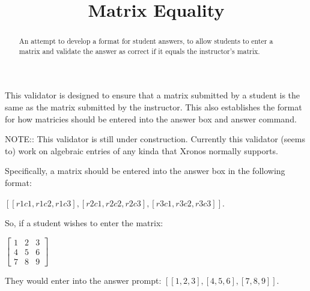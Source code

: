 \documentclass{ximera}
\title{Matrix Equality}
\begin{document}
\begin{abstract}
    An attempt to develop a format for student answers, to allow students to enter a matrix and validate the answer as correct if it equals the instructor's matrix.
\end{abstract}
\maketitle

This validator is designed to ensure that a matrix submitted by a student is the same as the matrix submitted by the instructor. This also establishes the format for how matricies should be entered into the answer box and answer command.

NOTE:: This validator is still under construction. Currently this validator (seems to) work on algebraic entries of any kinda that Xronos normally supports.

Specifically, a matrix should be entered into the answer box in the following format:

$[ [r1c1,r1c2,r1c3],[r2c1,r2c2,r2c3],[r3c1,r3c2,r3c3] ]$.

So, if a student wishes to enter the matrix:

$\left[\begin{matrix}
1 & 2 & 3 \\
4 & 5 & 6 \\
7 & 8 & 9
\end{matrix}\right]$

They would enter into the answer prompt: $[ [1,2,3], [4,5,6], [7,8,9] ]$.\\
\end{document}
